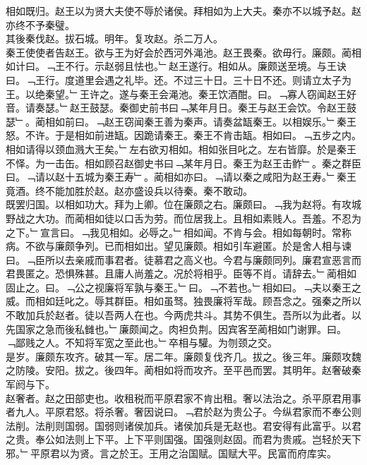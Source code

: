 \documentclass{zhvt-classic}
\begin{document}
\hspace*{2em}相如既归。赵王以为贤大夫使不辱於诸侯。拜相如为上大夫。秦亦不以城予赵。赵亦终不予秦璧。\\
\hspace*{2em}其後秦伐赵。拔石城。明年。复攻赵。杀二万人。\\
\hspace*{2em}秦王使使者告赵王。欲与王为好会於西河外渑池。赵王畏秦。欲毋行。廉颇。蔺相如计曰。﹁王不行。示赵弱且怯也。﹂赵王遂行。相如从。廉颇送至境。与王诀曰。﹁王行。度道里会遇之礼毕。还。不过三十日。三十日不还。则请立太子为王。以绝秦望。﹂王许之。遂与秦王会渑池。秦王饮酒酣。曰。﹁寡人窃闻赵王好音。请奏瑟。﹂赵王鼓瑟。秦御史前书曰﹁某年月日。秦王与赵王会饮。令赵王鼓瑟﹂。蔺相如前曰。﹁赵王窃闻秦王善为秦声。请奏盆缻秦王。以相娱乐。﹂秦王怒。不许。于是相如前进缻。因跪请秦王。秦王不肯击缻。相如曰。﹁五步之内。相如请得以颈血溅大王矣。﹂左右欲刃相如。相如张目叱之。左右皆靡。於是秦王不怿。为一击缶。相如顾召赵御史书曰﹁某年月日。秦王为赵王击鲊﹂。秦之群臣曰。﹁请以赵十五城为秦王寿﹂。蔺相如亦曰。﹁请以秦之咸阳为赵王寿。﹂秦王竟酒。终不能加胜於赵。赵亦盛设兵以待秦。秦不敢动。\\
\hspace*{2em}既罢归国。以相如功大。拜为上卿。位在廉颇之右。廉颇曰。﹁我为赵将。有攻城野战之大功。而蔺相如徒以口舌为劳。而位居我上。且相如素贱人。吾羞。不忍为之下。﹂宣言曰。﹁我见相如。必辱之。﹂相如闻。不肯与会。相如每朝时。常称病。不欲与廉颇争列。已而相如出。望见廉颇。相如引车避匿。於是舍人相与谏曰。﹁臣所以去亲戚而事君者。徒慕君之高义也。今君与廉颇同列。廉君宣恶言而君畏匿之。恐惧殊甚。且庸人尚羞之。况於将相乎。臣等不肖。请辞去。﹂蔺相如固止之。曰。﹁公之视廉将军孰与秦王。﹂曰。﹁不若也。﹂相如曰。﹁夫以秦王之威。而相如廷叱之。辱其群臣。相如虽驽。独畏廉将军哉。顾吾念之。强秦之所以不敢加兵於赵者。徒以吾两人在也。今两虎共斗。其势不俱生。吾所以为此者。以先国家之急而後私雠也。﹂廉颇闻之。肉袒负荆。因宾客至蔺相如门谢罪。曰。﹁鄙贱之人。不知将军宽之至此也。﹂卒相与驩。为刎颈之交。\\
\hspace*{2em}是岁。廉颇东攻齐。破其一军。居二年。廉颇复伐齐几。拔之。後三年。廉颇攻魏之防陵。安阳。拔之。後四年。蔺相如将而攻齐。至平邑而罢。其明年。赵奢破秦军阏与下。\\
\hspace*{2em}赵奢者。赵之田部吏也。收租税而平原君家不肯出租。奢以法治之。杀平原君用事者九人。平原君怒。将杀奢。奢因说曰。﹁君於赵为贵公子。今纵君家而不奉公则法削。法削则国弱。国弱则诸侯加兵。诸侯加兵是无赵也。君安得有此富乎。以君之贵。奉公如法则上下平。上下平则国强。国强则赵固。而君为贵戚。岂轻於天下邪。﹂平原君以为贤。言之於王。王用之治国赋。国赋大平。民富而府库实。\\
\end{document}

